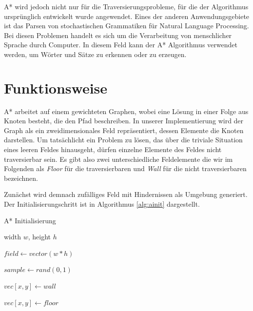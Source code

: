 \documentclass[10pt,twocolumn]{scrartcl}
\begin{document}
A* wird jedoch nicht nur für die Traversierungsprobleme, für die der Algorithmus ursprünglich entwickelt wurde angewendet.
Eines der anderen Anwendungsgebiete ist das Parsen von stochastischen Grammatiken für Natural Language Processing.
Bei diesen Problemen handelt es sich um die Verarbeitung von menschlicher Sprache durch Computer.
In diesem Feld kann der A* Algorithmus verwendet werden, um Wörter und Sätze zu erkennen oder zu erzeugen.

\section*{Funktionsweise}


A* arbeitet auf einem gewichteten Graphen, wobei eine Lösung in einer Folge aus Knoten besteht, die den Pfad beschreiben. In unserer Implementierung wird der Graph als ein zweidimensionales Feld repräsentiert, dessen Elemente die Knoten darstellen. Um tatsächlicht ein Problem zu lösen, das über die triviale Situation eines leeren Feldes hinausgeht, dürfen einzelne Elemente des Feldes nicht traversierbar sein. Es gibt also zwei unterschiedliche Feldelemente die wir im Folgenden als \textit{Floor} für die traversierbaren und \textit{Wall} für die nicht traversierbaren bezeichnen.


Zunächst wird demnach zufälliges Feld mit Hindernissen als Umgebung generiert. Der Initialisierungschritt ist in Algorithmus \ref{alg:ainit} dargestellt. 

\begin{algorithm} 
\caption{A* Initialisierung} 
\label{alg:ainit} 
\begin{algorithmic}
	\REQUIRE width $w$, height $h$
	
	\STATE $field \leftarrow vector(w*h)$
	
	

	\STATE $sample \leftarrow rand(0,1)$	

	\STATE $vec[x,y] \leftarrow wall$	
	
	\ELSE
	
	\STATE $vec[x,y] \leftarrow floor$	
	
	\ENDIF	
	
	\ENDFOR
	\ENDFOR
\end{algorithmic}
\end{algorithm}
\end{document}

